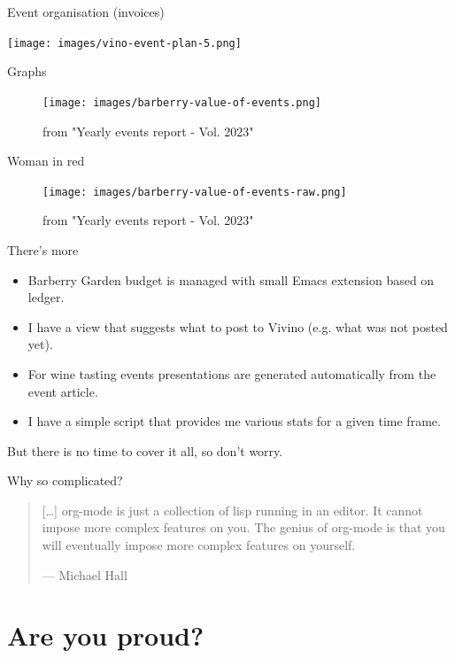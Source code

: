 \documentclass[presentation,aspectratio=169,smaller]{beamer}
\begin{document}
\begin{frame}[label={sec:orgf2647db}]{Event organisation (invoices)}
\begin{center}
\texttt{[image: images/vino-event-plan-5.png]}
\end{center}
\end{frame}
\begin{frame}[label={sec:org993f7d8}]{Graphs}
\begin{figure}[htbp]
\centering
\texttt{[image: images/barberry-value-of-events.png]}
\caption{from "Yearly events report - Vol. 2023"}
\end{figure}
\end{frame}
\begin{frame}[label={sec:orgbccee3c}]{Woman in red}
\begin{figure}[htbp]
\centering
\texttt{[image: images/barberry-value-of-events-raw.png]}
\caption{from "Yearly events report - Vol. 2023"}
\end{figure}
\end{frame}
\begin{frame}[label={sec:orga6ca209}]{There's more}
\begin{itemize}
\item Barberry Garden budget is managed with small Emacs extension based on ledger.
\item I have a view that suggests what to post to Vivino (e.g. what was not posted yet).
\item For wine tasting events presentations are generated automatically from the event article.
\item I have a simple script that provides me various stats for a given time frame.
\end{itemize}

But there is no time to cover it all, so don't worry.
\end{frame}
\begin{frame}[label={sec:org8d8f69f}]{Why so complicated?}
\begin{quote}
{[}…] org-mode is just a collection of lisp running in an editor. It cannot impose more complex features on you. \alert{The genius of org-mode is that you will eventually impose more complex features on yourself.}

--- Michael Hall
\end{quote}
\end{frame}
\section{Are you proud?}
\label{sec:org44c1bb5}
\end{document}
